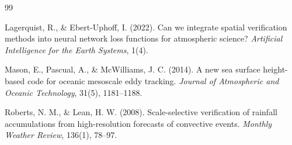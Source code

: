 \documentclass[11pt]{article}
\begin{document}
\begin{thebibliography}{99}

 Lagerquist, R., \& Ebert-Uphoff, I. (2022). Can we integrate spatial verification methods into neural network loss functions for atmospheric science? \textit{Artificial Intelligence for the Earth Systems}, 1(4).

 Mason, E., Pascual, A., \& McWilliams, J. C. (2014). A new sea surface height-based code for oceanic mesoscale eddy tracking. \textit{Journal of Atmospheric and Oceanic Technology}, 31(5), 1181--1188.

 Roberts, N. M., \& Lean, H. W. (2008). Scale-selective verification of rainfall accumulations from high-resolution forecasts of convective events. \textit{Monthly Weather Review}, 136(1), 78--97.

\end{thebibliography}
\end{document}
